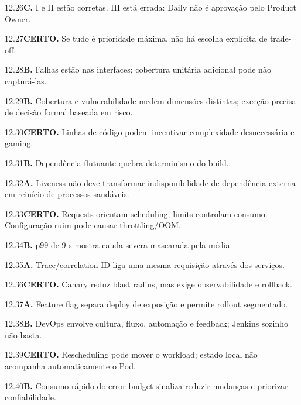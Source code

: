 \begin{solucao}{12.26}\textbf{C.} I e II estão corretas. III está errada: Daily não é aprovação pelo Product Owner.\end{solucao}
\begin{solucao}{12.27}\textbf{CERTO.} Se tudo é prioridade máxima, não há escolha explícita de trade-off.\end{solucao}
\begin{solucao}{12.28}\textbf{B.} Falhas estão nas interfaces; cobertura unitária adicional pode não capturá-las.\end{solucao}
\begin{solucao}{12.29}\textbf{B.} Cobertura e vulnerabilidade medem dimensões distintas; exceção precisa de decisão formal baseada em risco.\end{solucao}
\begin{solucao}{12.30}\textbf{CERTO.} Linhas de código podem incentivar complexidade desnecessária e gaming.\end{solucao}
\begin{solucao}{12.31}\textbf{B.} Dependência flutuante quebra determinismo do build.\end{solucao}
\begin{solucao}{12.32}\textbf{A.} Liveness não deve transformar indisponibilidade de dependência externa em reinício de processos saudáveis.\end{solucao}
\begin{solucao}{12.33}\textbf{CERTO.} Requests orientam scheduling; limits controlam consumo. Configuração ruim pode causar throttling/OOM.\end{solucao}
\begin{solucao}{12.34}\textbf{B.} p99 de 9 s mostra cauda severa mascarada pela média.\end{solucao}
\begin{solucao}{12.35}\textbf{A.} Trace/correlation ID liga uma mesma requisição através dos serviços.\end{solucao}
\begin{solucao}{12.36}\textbf{CERTO.} Canary reduz blast radius, mas exige observabilidade e rollback.\end{solucao}
\begin{solucao}{12.37}\textbf{A.} Feature flag separa deploy de exposição e permite rollout segmentado.\end{solucao}
\begin{solucao}{12.38}\textbf{B.} DevOps envolve cultura, fluxo, automação e feedback; Jenkins sozinho não basta.\end{solucao}
\begin{solucao}{12.39}\textbf{CERTO.} Rescheduling pode mover o workload; estado local não acompanha automaticamente o Pod.\end{solucao}
\begin{solucao}{12.40}\textbf{B.} Consumo rápido do error budget sinaliza reduzir mudanças e priorizar confiabilidade.\end{solucao}

